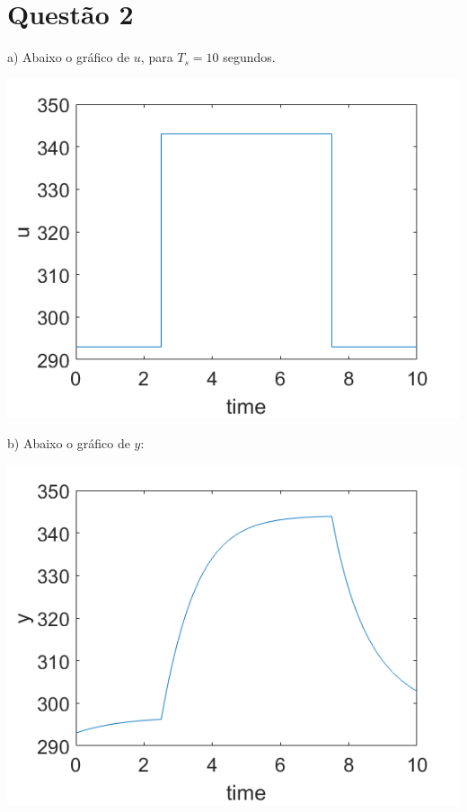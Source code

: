 \documentclass{rbfin}
\begin{document}
\newpage

\section*{Questão 2}

a) Abaixo o gráfico de $u$, para $T_s = 10$ segundos.

\begin{center}
\includegraphics[scale=0.666]{q2a}
\end{center}

b) Abaixo o gráfico de $y$:

\begin{center}
\includegraphics[scale=0.666]{q2b}
\end{center}
\end{document}
